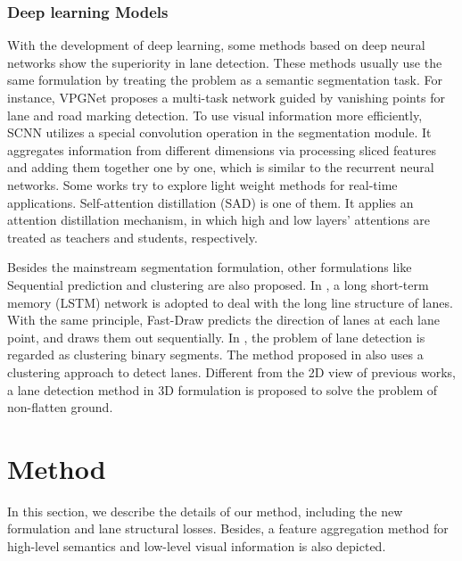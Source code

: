 \documentclass[runningheads]{llncs}
\begin{document}
\subsubsection{Deep learning Models}
With the development of deep learning, some methods \cite{kim2014robust,Empirical_Evaluation} based on deep neural networks show the superiority in lane detection. These methods usually use the same formulation by treating the problem as a semantic segmentation task. For instance, VPGNet \cite{Lee_2017_ICCV} proposes a multi-task network guided by vanishing points for lane and road marking detection. To use visual information more efficiently, SCNN \cite{SCNN} utilizes a special convolution operation in the segmentation module. It aggregates information from different dimensions via processing sliced features and adding them together one by one, which is similar to the recurrent neural networks. Some works try to explore light weight methods for real-time applications. Self-attention distillation (SAD) \cite{SAD} is one of them. It applies an attention distillation mechanism, in which high and low layers' attentions are treated as teachers and students, respectively. 

Besides the mainstream segmentation formulation, other formulations like Sequential prediction and clustering are also proposed. In \cite{li2016deep}, a long short-term memory (LSTM) network is adopted to deal with the long line structure of lanes. With the same principle, Fast-Draw \cite{FastDraw} predicts the direction of lanes at each lane point, and draws them out sequentially. In \cite{Proposal-Free}, the problem of lane detection is regarded as clustering binary segments. The method proposed in \cite{agnostic} also uses a clustering approach to detect lanes. Different from the 2D view of previous works, a lane detection method in 3D formulation \cite{garnett20193d} is proposed to solve the problem of non-flatten ground.


\section{Method}
In this section, we describe the details of our method, including the new formulation and lane structural losses. Besides, a feature aggregation method for high-level semantics and low-level visual information is also depicted.
\vspace{-10pt}
\end{document}
